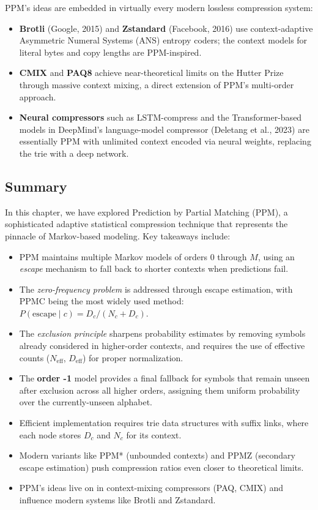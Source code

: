 PPM's ideas are embedded in virtually every modern lossless compression system:
\begin{itemize}
    \item \textbf{Brotli} (Google, 2015) and \textbf{Zstandard} (Facebook, 2016)
          use context-adaptive Asymmetric Numeral Systems (ANS) entropy coders;
          the context models for literal bytes and copy lengths are PPM-inspired.
    \item \textbf{CMIX} and \textbf{PAQ8} achieve near-theoretical limits on the
          Hutter Prize through massive context mixing, a direct extension of PPM's
          multi-order approach.
    \item \textbf{Neural compressors} such as LSTM-compress and the Transformer-based
          models in DeepMind's language-model compressor (Deletang et al., 2023) are
          essentially PPM with unlimited context encoded via neural weights, replacing
          the trie with a deep network.
\end{itemize}

\subsection*{Summary}

In this chapter, we have explored Prediction by Partial Matching (PPM), a 
sophisticated adaptive statistical compression technique that represents the 
pinnacle of Markov-based modeling. Key takeaways include:

\begin{itemize}
    \item PPM maintains multiple Markov models of orders $0$ through $M$, using 
          an \textit{escape} mechanism to fall back to shorter contexts when 
          predictions fail.
    \item The \textit{zero-frequency problem} is addressed through escape 
          estimation, with PPMC being the most widely used method:
          $P(\text{escape} \mid c) = D_c/(N_c + D_c)$.
    \item The \textit{exclusion principle} sharpens probability estimates by 
          removing symbols already considered in higher-order contexts, and requires the use of effective counts ($N_{\mathrm{eff}}$, $D_{\mathrm{eff}}$) for proper normalization.
    \item The \textbf{order -1} model provides a final fallback for symbols that remain unseen after exclusion across all higher orders, assigning them uniform probability over the currently-unseen alphabet.
    \item Efficient implementation requires trie data structures with suffix links,
          where each node stores $D_c$ and $N_c$ for its context.
    \item Modern variants like PPM* (unbounded contexts) and PPMZ (secondary escape 
          estimation) push compression ratios even closer to theoretical limits.
    \item PPM's ideas live on in context-mixing compressors (PAQ, CMIX) and 
          influence modern systems like Brotli and Zstandard.
\end{itemize}

